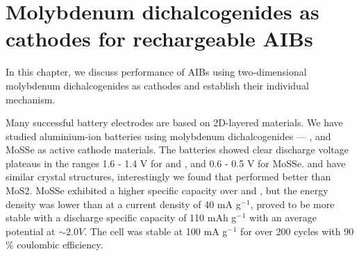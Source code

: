 \chapter{Molybdenum dichalcogenides as cathodes for rechargeable AIBs} %
In this chapter, we discuss performance of AIBs using two-dimensional molybdenum dichalcogenides as cathodes and establish their individual mechanism. 
\label{chap4} %

Many successful battery electrodes are based on 2D-layered materials. We have studied aluminium-ion batteries using molybdenum dichalcogenides --- ,  and MoSSe as active cathode materials. The batteries showed clear discharge voltage plateaus in the ranges 1.6 - 1.4 V for  and , and 0.6 - 0.5 V for MoSSe.  and  have similar crystal structures, interestingly we found that  performed better than MoS2. MoSSe exhibited a higher specific capacity over  and , but the energy density was lower than  at a current density of 40 mA g$^-{^1}$,  proved to be more stable with a discharge specific capacity of 110 mAh g$^-{^1}$ with an average potential at $\sim 2.0 V$. The cell was stable at 100 mA g$^-{^1}$ for over 200 cycles with 90 \% coulombic efficiency. 
